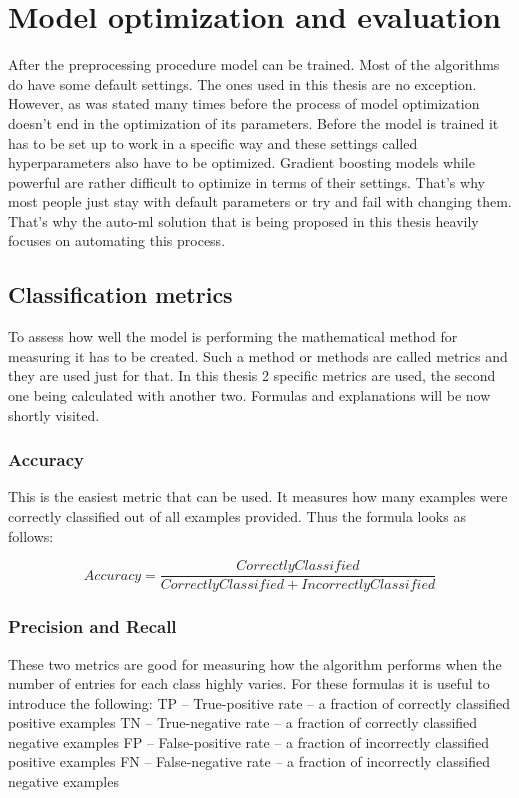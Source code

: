 \documentclass[a4paper,twoside,12pt]{book}
\begin{document}
\section{Model optimization and evaluation}

After the preprocessing procedure model can be trained. Most of the algorithms do have some default settings. The ones used in this thesis are no exception. However, as was stated many times before the process of model optimization doesn't end in the optimization of its parameters. Before the model is trained it has to be set up to work in a specific way and these settings called hyperparameters also have to be optimized. Gradient boosting models while powerful are rather difficult to optimize in terms of their settings. That's why most people just stay with default parameters or try and fail with changing them.
That's why the auto-ml solution that is being proposed in this thesis heavily focuses on automating this process.

\subsection{Classification metrics}
To assess how well the model is performing the mathematical method for measuring it has to be created.
Such a method or methods are called metrics and they are used just for that.
In this thesis 2 specific metrics are used, the second one being calculated with another two. Formulas and explanations will be now shortly visited.

\subsubsection{Accuracy}
This is the easiest metric that can be used. It measures how many examples were correctly classified out of all examples provided.
Thus the formula looks as follows:

\begin{equation}
\label{eq:accuracy}
Accuracy = \frac{Correctly Classified}{Correctly Classified + IncorrectlyClassified}
\end{equation}


\subsubsection{Precision and Recall}

These two metrics are good for measuring how the algorithm performs when the number of entries for each class highly varies. For these formulas it is useful to introduce the following:
\newline
\newline
TP -- True-positive rate -- a fraction of correctly classified positive examples
\newline
TN -- True-negative rate -- a fraction of correctly classified negative examples
\newline
FP -- False-positive rate -- a fraction of incorrectly classified positive examples
\newline
FN -- False-negative rate -- a fraction of incorrectly classified negative examples
\newline
\newline
\end{document}
